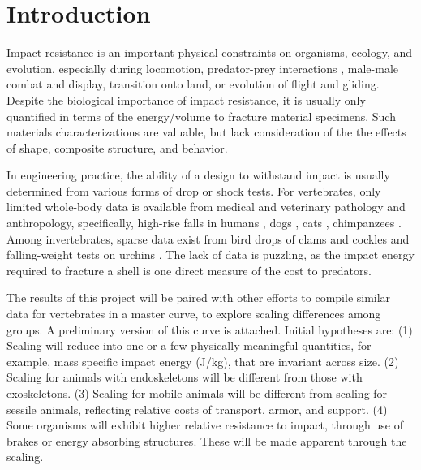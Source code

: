 \documentclass{jeb}
\begin{document}
\maketitle

\section{Introduction}
Impact resistance is an important physical constraints on organisms, ecology, and evolution, especially during locomotion, predator-prey interactions \citep{Patek:2005}, male-male combat and display, transition onto land, or evolution of flight and gliding.  Despite the biological importance of impact resistance, it is usually only quantified in terms of the energy/volume to fracture material specimens.  Such materials characterizations are valuable, but lack consideration of the the effects of shape, composite structure, and behavior.  

In engineering practice, the ability of a design to withstand impact is usually determined from various forms of drop or shock tests.  For vertebrates, only limited whole-body data is available from medical and veterinary pathology and anthropology, specifically, high-rise falls in humans \citep{Westman:2007, Goren:2004, DeHaven:1942}, dogs \citep{Gordon:1993}, cats \citep{Vnuk:2004}, chimpanzees \citep{Goodall:1986}.  Among invertebrates, sparse data exist from bird drops of clams and cockles \citep{Marron:1982} and falling-weight tests on urchins \citep{Strathmann:1981}.  The lack of data is puzzling, as the impact energy required to fracture a shell is one direct measure of the cost to predators. 

The results of this project will be paired with other efforts to compile similar data for vertebrates in a master curve, to explore scaling differences among groups.  A preliminary version of this curve is attached.  Initial hypotheses are: (1) Scaling will reduce into one or a few physically-meaningful quantities, for example, mass specific impact energy (J/kg), that are invariant across size.  (2) Scaling for animals with endoskeletons will be different from those with exoskeletons.  (3) Scaling for mobile animals will be different from scaling for sessile animals, reflecting relative costs of transport, armor, and support.  (4) Some organisms will exhibit higher relative resistance to impact, through use of brakes or energy absorbing structures.  These will be made apparent through the scaling.
\end{document}

